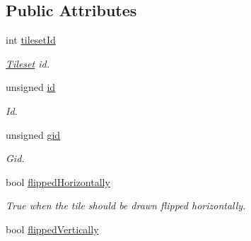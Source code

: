 \subsection*{Public Attributes}
\begin{DoxyCompactItemize}
\item 
\hypertarget{structTmx_1_1MapTile_a1229850428649e3bbb961c6e48907de5}{int \hyperlink{structTmx_1_1MapTile_a1229850428649e3bbb961c6e48907de5}{tileset\-Id}}\label{structTmx_1_1MapTile_a1229850428649e3bbb961c6e48907de5}

\begin{DoxyCompactList}\small\item\em \hyperlink{classTmx_1_1Tileset}{Tileset} id. \end{DoxyCompactList}\item 
\hypertarget{structTmx_1_1MapTile_a5e5e67a6ef3d7908885bce9d522e3d51}{unsigned \hyperlink{structTmx_1_1MapTile_a5e5e67a6ef3d7908885bce9d522e3d51}{id}}\label{structTmx_1_1MapTile_a5e5e67a6ef3d7908885bce9d522e3d51}

\begin{DoxyCompactList}\small\item\em Id. \end{DoxyCompactList}\item 
\hypertarget{structTmx_1_1MapTile_ae942fff5e6cb0f7fd9305ea419c156cd}{unsigned \hyperlink{structTmx_1_1MapTile_ae942fff5e6cb0f7fd9305ea419c156cd}{gid}}\label{structTmx_1_1MapTile_ae942fff5e6cb0f7fd9305ea419c156cd}

\begin{DoxyCompactList}\small\item\em Gid. \end{DoxyCompactList}\item 
\hypertarget{structTmx_1_1MapTile_ae64471c7caba072e91be5cbecd0afd3d}{bool \hyperlink{structTmx_1_1MapTile_ae64471c7caba072e91be5cbecd0afd3d}{flipped\-Horizontally}}\label{structTmx_1_1MapTile_ae64471c7caba072e91be5cbecd0afd3d}

\begin{DoxyCompactList}\small\item\em True when the tile should be drawn flipped horizontally. \end{DoxyCompactList}\item 
\hypertarget{structTmx_1_1MapTile_a86f732bd548caf59ac25755663871fbe}{bool \hyperlink{structTmx_1_1MapTile_a86f732bd548caf59ac25755663871fbe}{flipped\-Vertically}}\label{structTmx_1_1MapTile_a86f732bd548caf59ac25755663871fbe}


\end{DoxyCompactItemize}
